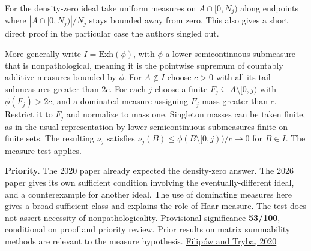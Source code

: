 \documentclass[11pt]{article}
\begin{document}
For the density-zero ideal take uniform measures on \(A\cap[0,N_j)\) along endpoints where \(|A\cap[0,N_j)|/N_j\) stays bounded away from zero. This also gives a short direct proof in the particular case the authors singled out.

More generally write \(I=\mathrm{Exh}(\phi)\), with \(\phi\) a lower semicontinuous submeasure that is nonpathological, meaning it is the pointwise supremum of countably additive measures bounded by \(\phi\). For \(A\notin I\) choose \(c>0\) with all its tail submeasures greater than \(2c\). For each \(j\) choose a finite \(F_j\subseteq A\setminus[0,j)\) with \(\phi(F_j)>2c\), and a dominated measure assigning \(F_j\) mass greater than \(c\). Restrict it to \(F_j\) and normalize to mass one. Singleton masses can be taken finite, as in the usual representation by lower semicontinuous submeasures finite on finite sets. The resulting \(\nu_j\) satisfies \(\nu_j(B)\le\phi(B\setminus[0,j))/c\to0\) for \(B\in I\). The measure test applies.

\textbf{Priority.} The 2020 paper already expected the density-zero answer. The 2026 paper gives its own sufficient condition involving the eventually-different ideal, and a counterexample for another ideal. The use of dominating measures here gives a broad sufficient class and explains the role of Haar measure. The test does not assert necessity of nonpathologicality. Provisional significance \textbf{53/100}, conditional on proof and priority review. Prior results on matrix summability methods are relevant to the measure hypothesis. \href{https://doi.org/10.1016/j.jmaa.2019.123760}{Filipów and Tryba, 2020}
\end{document}
